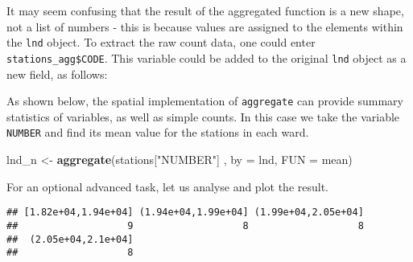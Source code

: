 \documentclass[]{article}
\newenvironment{Shaded}{}{}
\newcommand{\KeywordTok}[1]{\textcolor[rgb]{0.00,0.44,0.13}{\textbf{{#1}}}}
\newcommand{\DataTypeTok}[1]{\textcolor[rgb]{0.56,0.13,0.00}{{#1}}}
\newcommand{\StringTok}[1]{\textcolor[rgb]{0.25,0.44,0.63}{{#1}}}
\newcommand{\CommentTok}[1]{\textcolor[rgb]{0.38,0.63,0.69}{\textit{{#1}}}}
\newcommand{\NormalTok}[1]{{#1}}
\begin{document}
It may seem confusing that the result of the aggregated function is a
new shape, not a list of numbers - this is because values are assigned
to the elements within the \texttt{lnd} object. To extract the raw count
data, one could enter \texttt{stations\_agg\$CODE}. This variable could
be added to the original \texttt{lnd} object as a new field, as follows:

\begin{Shaded}
\end{Shaded}

As shown below, the spatial implementation of \texttt{aggregate} can
provide summary statistics of variables, as well as simple counts. In
this case we take the variable \texttt{NUMBER} and find its mean value
for the stations in each ward.

\begin{Shaded}
\begin{Highlighting}[]
\NormalTok{lnd_n <-}\StringTok{ }\KeywordTok{aggregate}\NormalTok{(stations[}\StringTok{"NUMBER"}\NormalTok{] , }\DataTypeTok{by =} \NormalTok{lnd, }\DataTypeTok{FUN =} \NormalTok{mean)}
\end{Highlighting}
\end{Shaded}

For an optional advanced task, let us analyse and plot the result.

\begin{Shaded}
\end{Shaded}

\begin{verbatim}
## [1.82e+04,1.94e+04] (1.94e+04,1.99e+04] (1.99e+04,2.05e+04] 
##                   9                   8                   8 
##  (2.05e+04,2.1e+04] 
##                   8
\end{verbatim}
\end{document}
